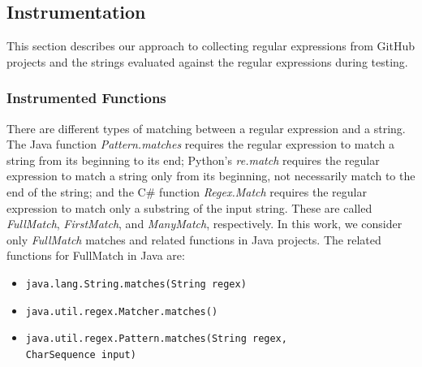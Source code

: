 \subsection{Instrumentation}
\label{rq1instrumentation}
This section describes our approach to collecting regular expressions from GitHub projects and the strings evaluated against the regular expressions during testing. 

\subsubsection{Instrumented Functions}
\label{sec:instrumentedfunctions}
There are different types of matching between a regular expression and a string. The Java function \emph{Pattern.matches} requires the regular expression to match a string from its beginning to its end; Python's \emph{re.match} requires the regular expression to match a string only from its beginning, not necessarily match to the end of the string; and the C\# function \emph{Regex.Match} requires the regular expression to match only a substring of the input string. These are called \emph{FullMatch}, \emph{FirstMatch}, and \emph{ManyMatch}, respectively. 
In this work, we consider only \emph{FullMatch} matches and related functions in  Java projects. 
The related functions for FullMatch in Java are:
\begin{itemize}
\item \texttt{java.lang.String.matches(String regex)}
\item \texttt{java.util.regex.Matcher.matches()}
\item \texttt{java.util.regex.Pattern.matches(String regex,\\ CharSequence input)}
\end{itemize}
